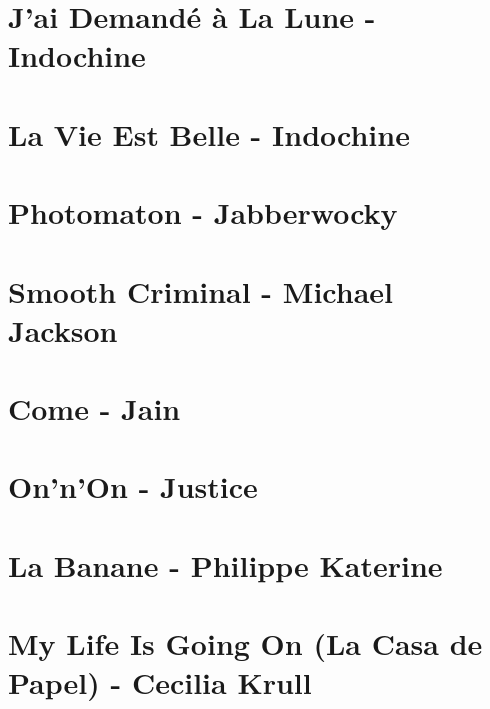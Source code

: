 \documentclass[11pt]{article}
\begin{document}
\section{J'ai Demandé à La Lune - Indochine}



\section{La Vie Est Belle - Indochine}
\begin{guitar}

\end{guitar}

\section{Photomaton - Jabberwocky}
\begin{guitar}

\end{guitar}



\section{Smooth Criminal - Michael Jackson}
\begin{guitar}

\end{guitar}

\section{Come - Jain}
\begin{guitar}

\end{guitar}

\section{On'n'On - Justice}


\section{La Banane - Philippe Katerine}


\section{My Life Is Going On (La Casa de Papel) - Cecilia Krull }
\begin{guitar}

\end{guitar}
\end{document}
